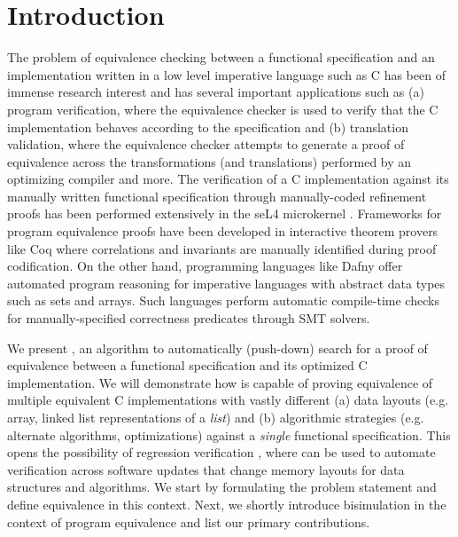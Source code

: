\section{Introduction}
\label{sec:syn-intro}

The problem of equivalence checking between a functional specification and an
implementation written in a low level imperative language such as C
has been of immense research interest
and has several important applications such as (a) program verification, where
the equivalence checker is used to verify that the C implementation
behaves according to the specification and (b) translation validation, where
the equivalence checker attempts to generate a proof of equivalence across
the transformations (and translations) performed by an optimizing compiler
and more. The verification of a C implementation against its manually written
functional specification through manually-coded refinement proofs has been
performed extensively in the seL4 microkernel \cite{seL4}.
Frameworks for program equivalence proofs have been developed in interactive
theorem provers like Coq \cite{programEquivalenceInCoq} where correlations and invariants
are manually identified during proof codification.
On the other hand, programming languages like Dafny \cite{dafny} offer automated program
reasoning for imperative languages with abstract data types such as sets and arrays.
Such languages perform automatic compile-time checks for manually-specified correctness predicates through
SMT solvers.

We present \toolName{}, an algorithm to automatically (push-down) search
for a proof of equivalence between a functional specification and its
optimized C implementation. We will demonstrate how \toolName{} is capable of
proving equivalence of multiple equivalent C implementations with vastly
different (a) data layouts (e.g. array, linked list representations of a {\em list})
and (b) algorithmic strategies (e.g. alternate algorithms, optimizations) against
a {\em single} functional specification.
This opens the possibility of regression verification \cite{strichman_regressverify,felsing14},
where \toolName{} can be used to automate verification across software updates that change memory layouts for
data structures and algorithms.
We start by formulating the problem statement and define equivalence in this context.
Next, we shortly introduce bisimulation in the context of program equivalence and list our primary contributions.

